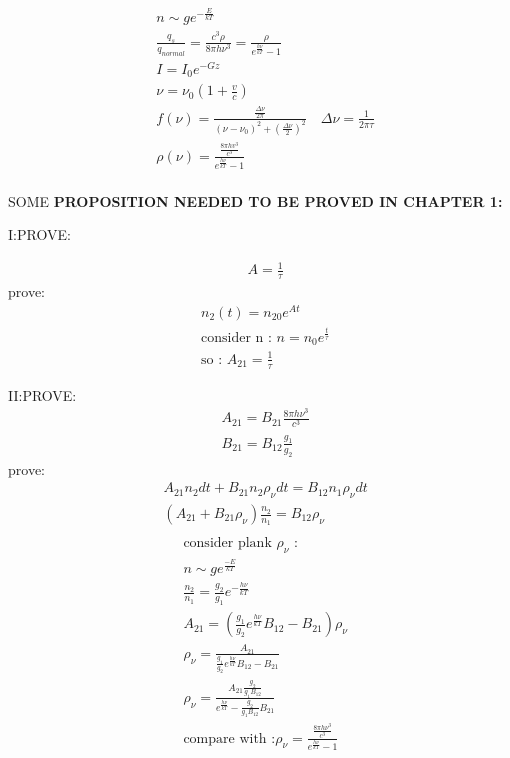 \documentclass{article}
\begin{document}
\begin{align}
&n\sim ge^{-\frac{E}{kT}}\\
&\frac{q_{s}}{q_{normal}}=\frac{c^3\rho}{8\pi h\nu^3}=\frac{\rho}{e^{\frac{h\nu}{kT}}-1}\\
&I=I_0e^{-Gz}\\
&\nu=\nu_0(1+\frac vc)\\
&f(\nu)=\frac{\frac{\Delta\nu}{2\pi}}{(\nu-\nu_0)^2+(\frac{\Delta\nu}2)^2}\quad\Delta\nu=\frac1{2\pi\tau}\\
&\rho(\nu)=\frac{\frac{8\pi hv^3}{c^3}}{e^{\frac{h\nu}{kT}}-1}\\
\end{align}

SOME \textbf{PROPOSITION NEEDED TO BE PROVED IN CHAPTER 1:}

I:PROVE:

\begin{align}
  &A=\frac1{\tau}
\end{align}
prove:
\begin{align*}
  &n_2(t)=n_{20}e^{At}\\
  &\text{consider n : }n=n_0e^{\frac{t}{\tau}}\\
  &\text{so : }A_{21}=\frac1\tau
\end{align*}

II:PROVE:
\begin{align}
&A_{21}=B_{21}\frac{8\pi h\nu^3}{c^3}\\
&B_{21}=B_{12}\frac{g_1}{g_2}
\end{align}
prove:
\begin{align*}
&A_{21}n_2dt+B_{21}n_{2}\rho_{\nu}dt=B_{12}n_1\rho_{\nu}dt\\
&(A_{21}+B_{21}\rho_{\nu})\frac{n_2}{n_1}=B_{12}\rho_{\nu}\\
\end{align*}
\begin{align*}
&\text{consider plank $\rho_{\nu}$ : }\\
&n\sim ge^{\frac{-E}{kT}}\\
&\frac{n_2}{n_1}=\frac{g_2}{g_1}e^{-\frac{h\nu}{kT}}\\
&A_{21}=(\frac{g_1}{g_2}e^{\frac{h\nu}{kT}} B_{12}-B_{21})\rho_{\nu}\\
&\rho_{\nu}=\frac{A_{21}}{\frac{g_1}{g_2}e^{\frac{h\nu}{kT}} B_{12}-B_{21}}\\
&\rho_{\nu}=\frac{A_{21}\frac{g_2}{g_1B_{12}}}{e^{\frac{h\nu}{kT}} -\frac{g_{2}}{g_1B_{12}} B_{21}}\\
&\text{compare with :}\rho_{\nu}=\frac{\frac{8\pi h\nu^3}{c^3}}{e^{\frac{h\nu}{kT}}-1}
\end{align*}
\end{document}
